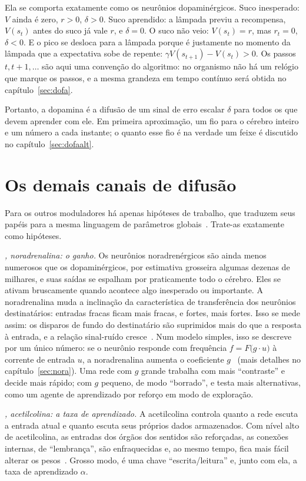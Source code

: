 Ela se comporta exatamente como os neurônios dopaminérgicos. Suco inesperado: $V$ ainda é zero, $r>0$, $\delta>0$. Suco aprendido: a lâmpada previu a recompensa, $V(s_t)$ antes do suco já vale $r$, e $\delta=0$. O suco não veio: $V(s_t)=r$, mas $r_t=0$, $\delta<0$. E o pico se desloca para a lâmpada porque é justamente no momento da lâmpada que a expectativa sobe de repente: $\gamma V(s_{t+1})-V(s_t)>0$. Os passos $t,t+1,\dots$ são aqui uma convenção do algoritmo: no organismo não há um relógio que marque os passos, e a mesma grandeza em tempo contínuo será obtida no capítulo~\ref{sec:dofa}.

Portanto, a dopamina é a difusão de um sinal de erro escalar $\delta$ para todos os que devem aprender com ele. Em primeira aproximação, um fio para o cérebro inteiro e um número a cada instante; o quanto esse fio é na verdade um feixe é discutido no capítulo~\ref{sec:dofaalt}.

\section{Os demais canais de difusão}

Para os outros moduladores há apenas hipóteses de trabalho, que traduzem seus papéis para a mesma linguagem de parâmetros globais~\cite{Doya2002}. Trate-as exatamente como hipóteses.

\emph{, noradrenalina: o ganho.} Os neurônios noradrenérgicos são ainda menos numerosos que os dopaminérgicos, por estimativa grosseira algumas dezenas de milhares, e suas saídas se espalham por praticamente todo o cérebro. Eles se ativam bruscamente quando acontece algo inesperado ou importante. A noradrenalina muda a inclinação da característica de transferência dos neurônios destinatários: entradas fracas ficam mais fracas, e fortes, mais fortes. Isso se mede assim: os disparos de fundo do destinatário são suprimidos mais do que a resposta à entrada, e a relação sinal-ruído cresce~\cite{Foote1975NE}. Num modelo simples, isso se descreve por um único número: se o neurônio responde com frequência $f=F\bigl(g\cdot u\bigr)$ à corrente de entrada $u$, a noradrenalina aumenta o coeficiente $g$~\cite{AstonJones2005} (mais detalhes no capítulo~\ref{sec:nora}). Uma rede com $g$ grande trabalha com mais ``contraste'' e decide mais rápido; com $g$ pequeno, de modo ``borrado'', e testa mais alternativas, como um agente de aprendizado por reforço em modo de exploração.

\emph{, acetilcolina: a taxa de aprendizado.} A acetilcolina controla quanto a rede escuta a entrada atual e quanto escuta seus próprios dados armazenados. Com nível alto de acetilcolina, as entradas dos órgãos dos sentidos são reforçadas, as conexões internas, de ``lembrança'', são enfraquecidas e, ao mesmo tempo, fica mais fácil alterar os pesos~\cite{Hasselmo2006}. Grosso modo, é uma chave ``escrita/leitura'' e, junto com ela, a taxa de aprendizado $\alpha$.

